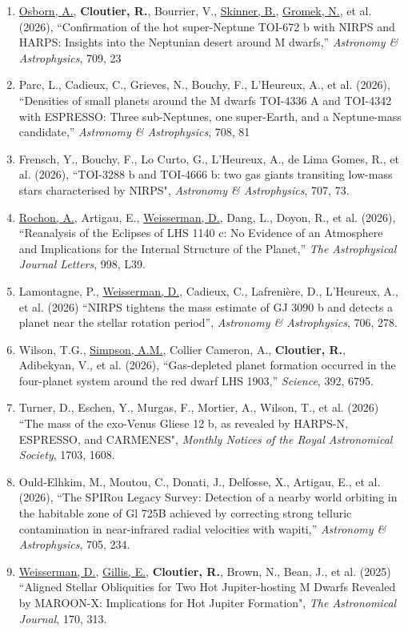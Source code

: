 \documentclass[12pt]{article}
\begin{document}
\begin{itemize}
\begin{enumerate}
\item \underline{Osborn, A.}, {\bf Cloutier, R.}, Bourrier, V., \underline{Skinner, B.}, \underline{Gromek, N.}, et al. (2026), ``Confirmation of the hot super-Neptune TOI-672 b with NIRPS and HARPS: Insights into the Neptunian desert around M dwarfs,'' {\it Astronomy \& Astrophysics}, 709, 23
\item Parc, L., Cadieux, C., Grieves, N., Bouchy, F., L'Heureux, A., et al. (2026), ``Densities of small planets around the M dwarfs TOI-4336 A and TOI-4342 with ESPRESSO: Three sub-Neptunes, one super-Earth, and a Neptune-mass candidate,'' {\it Astronomy \& Astrophysics}, 708, 81
\item Frensch, Y., Bouchy, F., Lo Curto, G., L'Heureux, A., de Lima Gomes, R., et al. (2026), ``TOI-3288 b and TOI-4666 b: two gas giants transiting low-mass stars characterised by NIRPS", {\it Astronomy \& Astrophysics}, 707, 73.
\item \underline{Rochon, A.}, Artigau, E., \underline{Weisserman, D.}, Dang, L., Doyon, R., et al. (2026), ``Reanalysis of the Eclipses of LHS 1140 c: No Evidence of an Atmosphere and Implications for the Internal Structure of the Planet,'' {\it The Astrophysical Journal Letters}, 998, L39.
\item Lamontagne, P., \underline{Weisserman, D.}, Cadieux, C., Lafreni\`ere, D., L'Heureux, A., et al. (2026) ``NIRPS tightens the mass estimate of GJ 3090 b and detects a planet near the stellar rotation period'', {\it Astronomy \& Astrophysics}, 706, 278.
\item Wilson, T.G., \underline{Simpson, A.M.}, Collier Cameron, A., {\bf Cloutier, R.}, Adibekyan, V., et al. (2026), ``Gas-depleted planet formation occurred in the four-planet system around the red dwarf LHS 1903,'' {\it Science}, 392, 6795.
\item Turner, D., Eschen, Y., Murgas, F., Mortier, A., Wilson, T., et al. (2026) ``The mass of the exo-Venus Gliese 12 b, as revealed by HARPS-N, ESPRESSO, and CARMENES", {\it Monthly Notices of the Royal Astronomical Society}, 1703, 1608.
\item Ould-Elhkim, M., Moutou, C., Donati, J., Delfosse, X., Artigau, E., et al. (2026), ``The SPIRou Legacy Survey: Detection of a nearby world orbiting in the habitable zone of Gl 725B achieved by correcting strong telluric contamination in near-infrared radial velocities with wapiti,'' {\it Astronomy \& Astrophysics}, 705, 234.
\item \underline{Weisserman, D.}, \underline{Gillis, E.}, \textbf{Cloutier, R.}, Brown, N., Bean, J., et al. (2025) ``Aligned Stellar Obliquities for Two Hot Jupiter-hosting M Dwarfs Revealed by MAROON-X: Implications for Hot Jupiter Formation", {\it The Astronomical Journal}, 170, 313.

\end{enumerate}
\end{itemize}
\end{document}

